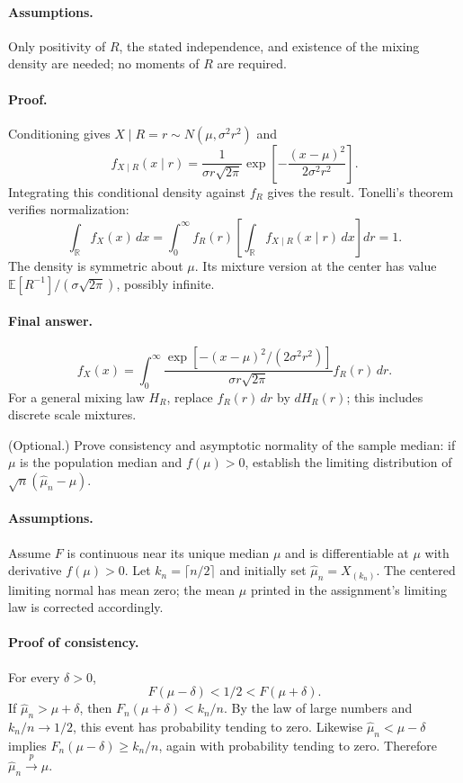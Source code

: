\documentclass[answers,12pt,addpoints]{exam}
\providecommand{\E}{\mathbb{E}}
\providecommand{\R}{\mathbb{R}}
\begin{document}
\begin{questions}
\begin{solution}
\paragraph{Assumptions.}
Only positivity of $R$, the stated independence, and existence of
the mixing density are needed; no moments of $R$ are required.

\paragraph{Proof.}
Conditioning gives $X\mid R=r\sim N(\mu,\sigma^2r^2)$ and
\[
f_{X\mid R}(x\mid r)=\frac1{\sigma r\sqrt{2\pi}}
\exp\left[-\frac{(x-\mu)^2}{2\sigma^2r^2}\right].
\]
Integrating this conditional density against $f_R$ gives the result.
Tonelli's theorem verifies normalization:
\[
\int_\R f_X(x)\,dx
=\int_0^\infty f_R(r)
\left[\int_\R f_{X\mid R}(x\mid r)\,dx\right]dr=1.
\]
The density is symmetric about $\mu$. Its mixture version at the
center has value $\E[R^{-1}]/(\sigma\sqrt{2\pi})$, possibly infinite.

\paragraph{Final answer.}
\[
\boxed{f_X(x)=\int_0^\infty
\frac{\exp[-(x-\mu)^2/(2\sigma^2r^2)]}{\sigma r\sqrt{2\pi}}
f_R(r)\,dr.}
\]
For a general mixing law $H_R$, replace $f_R(r)\,dr$ by $dH_R(r)$;
this includes discrete scale mixtures.
\end{solution}

\question
(Optional.) Prove consistency and asymptotic normality of the sample
median: if $\mu$ is the population median and $f(\mu)>0$, establish
the limiting distribution of $\sqrt n(\widehat\mu_n-\mu)$.

\begin{solution}
\paragraph{Assumptions.}
Assume $F$ is continuous near its unique median $\mu$ and is
differentiable at $\mu$ with derivative $f(\mu)>0$.
Let $k_n=\lceil n/2\rceil$ and initially set
$\widehat\mu_n=X_{(k_n)}$. The centered limiting normal has mean
zero; the mean $\mu$ printed in the assignment's limiting law is
corrected accordingly.

\paragraph{Proof of consistency.}
For every $\delta>0$,
\[
F(\mu-\delta)<1/2<F(\mu+\delta).
\]
If $\widehat\mu_n>\mu+\delta$, then
$F_n(\mu+\delta)<k_n/n$. By the law of large numbers and
$k_n/n\to1/2$, this event has probability tending to zero.
Likewise $\widehat\mu_n<\mu-\delta$ implies
$F_n(\mu-\delta)\geq k_n/n$, again with probability tending to zero.
Therefore $\widehat\mu_n\xrightarrow{p}\mu$.


\end{solution}
\end{questions}
\end{document}
